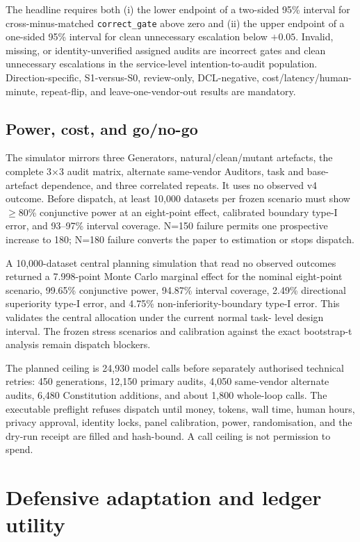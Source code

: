 \documentclass[10pt]{article}
\begin{document}
The headline requires both (i) the lower endpoint of a two-sided 95\% interval
for cross-minus-matched \texttt{correct\_gate} above zero and (ii) the upper endpoint of
a one-sided 95\% interval for clean unnecessary escalation below $+0.05$.
Invalid, missing, or identity-unverified assigned audits are incorrect gates
and clean unnecessary escalations in the service-level intention-to-audit
population. Direction-specific, S1-versus-S0, review-only, DCL-negative,
cost/latency/human-minute, repeat-flip, and leave-one-vendor-out results are
mandatory.

\subsection{Power, cost, and go/no-go}

The simulator mirrors three Generators, natural/clean/mutant artefacts, the
complete 3$\times$3 audit matrix, alternate same-vendor Auditors, task and
base-artefact dependence, and three correlated repeats. It uses no observed v4
outcome. Before dispatch, at least 10,000 datasets per frozen scenario must
show $\geq80$\% conjunctive power at an eight-point effect, calibrated boundary
type-I error, and 93--97\% interval coverage. N=150 failure permits one
prospective increase to 180; N=180 failure converts the paper to estimation or
stops dispatch.

A 10,000-dataset central planning simulation that read no observed outcomes
returned a 7.998-point Monte Carlo marginal effect for the nominal eight-point
scenario, 99.65\% conjunctive power, 94.87\% interval coverage, 2.49\%
directional superiority type-I error, and 4.75\% non-inferiority-boundary type-I
error. This validates the central allocation under the current normal task-
level design interval. The frozen stress scenarios and calibration against the
exact bootstrap-t analysis remain dispatch blockers.

The planned ceiling is 24,930 model calls before separately authorised
technical retries: 450 generations, 12,150 primary audits, 4,050 same-vendor
alternate audits, 6,480 Constitution additions, and about 1,800 whole-loop
calls. The executable preflight refuses dispatch until money, tokens, wall
time, human hours, privacy approval, identity locks, panel calibration, power,
randomisation, and the dry-run receipt are filled and hash-bound. A call ceiling
is not permission to spend.

\section{Defensive adaptation and ledger utility}
\end{document}
